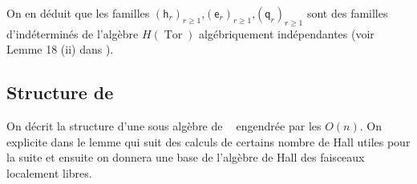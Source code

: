 \documentclass[12pt]{article}
\DeclareMathOperator{\Hom}{Hom}
\DeclareMathOperator{\ext}{Ext^{1}}
\DeclareMathOperator{\tor}{Tor}
\DeclareMathOperator{\coh}{Coh(\mathbb{P}_{k}^{1})}
\DeclareMathOperator{\hac}{H(\coh)}
\DeclareMathOperator{\hact}{H(\coh_{\tor})}
\DeclareMathOperator{\hacl}{H(\coh_{l})}
\theoremstyle{definition}
\newtheorem{Prop}{Proposition}[section]
\begin{document}
On en déduit que les familles $(\mathsf{h}_{r})_{r\geqslant 1}$,$(\mathsf{e}_{r})_{r\geqslant 1}$,$(\mathsf{q}_{r})_{r\geqslant 1}$ sont des familles d'indéterminés de l'algèbre $H(\tor)$ algébriquement indépendantes (voir Lemme 18 (ii) dans \cite{Baum}).
\subsection{Structure de $\hacl$}
On décrit la structure d'une sous algèbre de $\hacl$ engendrée par les $O(n)$. On explicite dans le lemme qui suit des calculs de certains nombre de Hall utiles pour la suite et ensuite on donnera une base de l'algèbre de Hall des faisceaux localement libres.  

\end{document}
